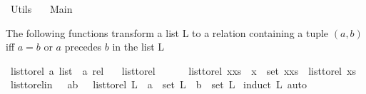 %
\begin{isabellebody}%
%
%
\isadelimtheory
\isanewline
%
\endisadelimtheory
%
\isatagtheory
{}\isamarkupfalse%
\ Utils\isanewline
\ \ \ Main\isanewline
{}%
\endisatagtheory
{\isafoldtheory}%
%
\isadelimtheory
%
\endisadelimtheory
%
\begin{isamarkuptext}%
The following functions transform a list L to a relation containing a  tuple $(a,b)$
  iff $a = b$ or $a$ precedes $b$ in the list L%
\end{isamarkuptext}\isamarkuptrue%
\isamarkupfalse%
\ list{\isacharunderscore}{\kern0pt}to{\isacharunderscore}{\kern0pt}rel{\isacharcolon}{\kern0pt}{\isacharcolon}{\kern0pt}\ {\isachardoublequoteopen}{\isacharprime}{\kern0pt}a\ list\ {\isasymRightarrow}\ {\isacharprime}{\kern0pt}a\ rel{\isachardoublequoteclose}\isanewline
\ \ \ {\isachardoublequoteopen}list{\isacharunderscore}{\kern0pt}to{\isacharunderscore}{\kern0pt}rel\ {\isacharbrackleft}{\kern0pt}{\isacharbrackright}{\kern0pt}\ {\isacharequal}{\kern0pt}\ {\isacharbraceleft}{\kern0pt}{\isacharbraceright}{\kern0pt}{\isachardoublequoteclose}\isanewline
\ \ {\isacharbar}{\kern0pt}\ {\isachardoublequoteopen}list{\isacharunderscore}{\kern0pt}to{\isacharunderscore}{\kern0pt}rel\ {\isacharparenleft}{\kern0pt}x{\isacharhash}{\kern0pt}xs{\isacharparenright}{\kern0pt}\ {\isacharequal}{\kern0pt}\ {\isacharbraceleft}{\kern0pt}x{\isacharbraceright}{\kern0pt}\ {\isasymtimes}\ {\isacharparenleft}{\kern0pt}set\ {\isacharparenleft}{\kern0pt}x{\isacharhash}{\kern0pt}xs{\isacharparenright}{\kern0pt}{\isacharparenright}{\kern0pt}\ {\isasymunion}\ list{\isacharunderscore}{\kern0pt}to{\isacharunderscore}{\kern0pt}rel\ xs{\isachardoublequoteclose}\isanewline
\isanewline
\isanewline
{}\isamarkupfalse%
\ list{\isacharunderscore}{\kern0pt}to{\isacharunderscore}{\kern0pt}rel{\isacharunderscore}{\kern0pt}in\ {\isacharcolon}{\kern0pt}\ {\isachardoublequoteopen}\ {\isacharparenleft}{\kern0pt}a{\isacharcomma}{\kern0pt}b{\isacharparenright}{\kern0pt}\ \ {\isasymin}\ {\isacharparenleft}{\kern0pt}list{\isacharunderscore}{\kern0pt}to{\isacharunderscore}{\kern0pt}rel\ L{\isacharparenright}{\kern0pt}\ {\isasymlongrightarrow}\ a\ {\isasymin}\ set\ L\ {\isasymand}\ b\ {\isasymin}\ set\ L{\isachardoublequoteclose}\ \isanewline
%
\isadelimproof
%
\endisadelimproof
%
\isatagproof
{}\isamarkupfalse%
{\isacharparenleft}{\kern0pt}induct\ L{\isacharcomma}{\kern0pt}\ auto{\isacharparenright}{\kern0pt}\ \isamarkupfalse%

\end{isabellebody}
